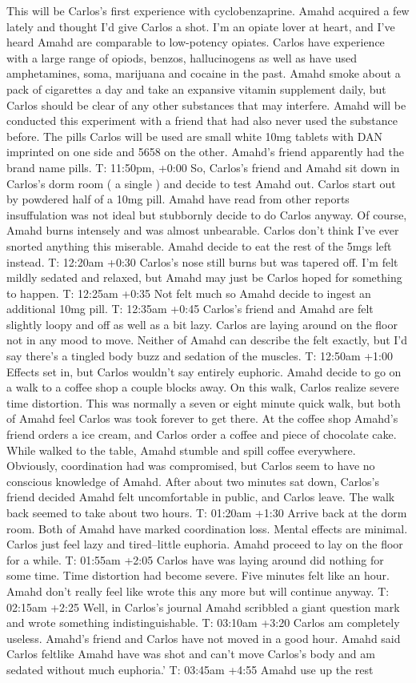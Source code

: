 \documentclass[12pt]{book}
\begin{document}
This will be Carlos's first experience with cyclobenzaprine. Amahd acquired a few lately and thought I'd give Carlos a shot. I'm an opiate lover at heart, and I've heard Amahd are comparable to low-potency opiates. Carlos have experience with a large range of opiods, benzos, hallucinogens as well as have used amphetamines, soma, marijuana and cocaine in the past. Amahd smoke about a pack of cigarettes a day and take an expansive vitamin supplement daily, but Carlos should be clear of any other substances that may interfere. Amahd will be conducted this experiment with a friend that had also never used the substance before. The pills Carlos will be used are small white 10mg tablets with DAN imprinted on one side and 5658 on the other. Amahd's friend apparently had the brand name pills. T: 11:50pm, +0:00 So, Carlos's friend and Amahd sit down in Carlos's dorm room ( a single ) and decide to test Amahd out. Carlos start out by powdered half of a 10mg pill. Amahd have read from other reports insuffulation was not ideal but stubbornly decide to do Carlos anyway. Of course, Amahd burns intensely and was almost unbearable. Carlos don't think I've ever snorted anything this miserable. Amahd decide to eat the rest of the 5mgs left instead. T: 12:20am +0:30 Carlos's nose still burns but was tapered off. I'm felt mildly sedated and relaxed, but Amahd may just be Carlos hoped for something to happen. T: 12:25am +0:35 Not felt much so Amahd decide to ingest an additional 10mg pill. T: 12:35am +0:45 Carlos's friend and Amahd are felt slightly loopy and off as well as a bit lazy. Carlos are laying around on the floor not in any mood to move. Neither of Amahd can describe the felt exactly, but I'd say there's a tingled body buzz and sedation of the muscles. T: 12:50am +1:00 Effects set in, but Carlos wouldn't say entirely euphoric. Amahd decide to go on a walk to a coffee shop a couple blocks away. On this walk, Carlos realize severe time distortion. This was normally a seven or eight minute quick walk, but both of Amahd feel Carlos was took forever to get there. At the coffee shop Amahd's friend orders a ice cream, and Carlos order a coffee and piece of chocolate cake. While walked to the table, Amahd stumble and spill coffee everywhere. Obviously, coordination had was compromised, but Carlos seem to have no conscious knowledge of Amahd. After about two minutes sat down, Carlos's friend decided Amahd felt uncomfortable in public, and Carlos leave. The walk back seemed to take about two hours. T: 01:20am +1:30 Arrive back at the dorm room. Both of Amahd have marked coordination loss. Mental effects are minimal. Carlos just feel lazy and tired--little euphoria. Amahd proceed to lay on the floor for a while. T: 01:55am +2:05 Carlos have was laying around did nothing for some time. Time distortion had become severe. Five minutes felt like an hour. Amahd don't really feel like wrote this any more but will continue anyway. T: 02:15am +2:25 Well, in Carlos's journal Amahd scribbled a giant question mark and wrote something indistinguishable. T: 03:10am +3:20 Carlos am completely useless. Amahd's friend and Carlos have not moved in a good hour. Amahd said Carlos feltlike Amahd have was shot and can't move Carlos's body and am sedated without much euphoria.' T: 03:45am +4:55 Amahd use up the rest 
\end{document}
